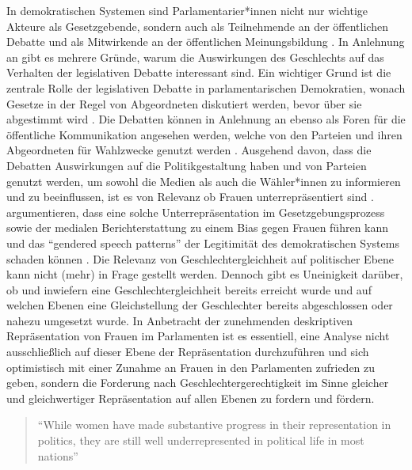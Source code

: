 \documentclass[12pt, 
    twoside=false, 
    bibliography=totoc, 
    numbers=endperiod, 
    headings=normal, 
    toc=chapterentrydotfill
    ]{scrbook}
\begin{document}
In demokratischen Systemen sind Parlamentarier*innen nicht nur wichtige Akteure als Gesetzgebende, sondern auch als Teilnehmende an der öffentlichen Debatte und als Mitwirkende an der öffentlichen Meinungsbildung \parencite[188]{dahlerup_2018}.
In Anlehnung an \textcite{back_2018} gibt es mehrere Gründe, warum die Auswirkungen des Geschlechts auf das Verhalten der legislativen Debatte interessant sind. Ein wichtiger Grund ist die zentrale Rolle der legislativen Debatte in parlamentarischen Demokratien, wonach Gesetze in der Regel von Abgeordneten diskutiert werden, bevor über sie abgestimmt wird \parencites[2]{back_2018}{back_2016}{proksch_2015}.
Die Debatten können in Anlehnung an \textcite[1]{proksch_2015} ebenso als Foren für die öffentliche Kommunikation angesehen werden, welche von den Parteien und ihren Abgeordneten für Wahlzwecke genutzt werden \parencite[2]{back_2018}. Ausgehend davon, dass die Debatten Auswirkungen auf die Politikgestaltung haben und von Parteien genutzt werden, um sowohl die Medien als auch die Wähler*innen zu informieren und zu beeinflussen, ist es von Relevanz ob Frauen unterrepräsentiert sind \parencite[2]{back_2018}. \citeauthor{back_2018} argumentieren, dass eine solche Unterrepräsentation im Gesetzgebungsprozess sowie der medialen Berichterstattung zu einem Bias gegen Frauen führen kann und das \enquote{gendered speech patterns} der Legitimität des demokratischen Systems schaden können \parencite[2]{back_2018}.
Die Relevanz von Geschlechtergleichheit auf politischer Ebene kann nicht (mehr) in Frage gestellt werden. Dennoch gibt es Uneinigkeit darüber, ob und inwiefern eine Geschlechtergleichheit bereits erreicht wurde und auf welchen Ebenen eine Gleichstellung der Geschlechter bereits abgeschlossen oder nahezu umgesetzt wurde. In Anbetracht der zunehmenden deskriptiven Repräsentation von Frauen im Parlamenten ist es essentiell, eine Analyse nicht ausschließlich auf dieser Ebene der Repräsentation durchzuführen und sich optimistisch mit einer Zunahme an Frauen in den Parlamenten zufrieden zu geben, sondern die Forderung nach Geschlechtergerechtigkeit im Sinne gleicher und gleichwertiger Repräsentation auf allen Ebenen zu fordern und fördern. 

\citereset
\begin{quote}
    \enquote{While women have made substantive progress in their representation in politics, they are still well underrepresented in political life in most nations} \parencite[2]{coffe_2013}
\end{quote}
\end{document}
